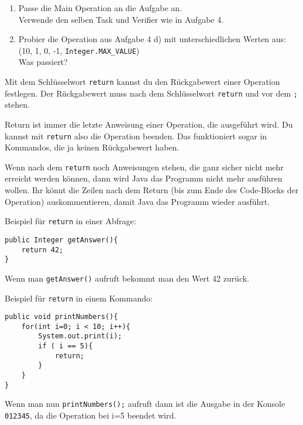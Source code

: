 
\begin{enumerate}
	\item
		Passe die Main Operation an die Aufgabe an.\\
		Verwende den selben Task und Verifier wie in Aufgabe 4.

	\item
		Probier die Operation aus Aufgabe 4 d) mit unterschiedlichen Werten aus: (10, 1, 0, -1, \lstinline{Integer.MAX_VALUE}) \\
		Was passiert?
\end{enumerate}

	
\begin{Infobox}[Return]
	Mit dem Schlüsselwort \lstinline{return} kannst du den Rückgabewert einer Operation festlegen.
	Der Rückgabewert muss nach dem Schlüsselwort \lstinline{return} und vor dem \lstinline{;} stehen.

	Return ist immer die letzte Anweisung einer Operation, die ausgeführt wird.
	Du kannst mit \lstinline{return} also die Operation beenden.
	Das funktioniert sogar in Kommandos, die ja keinen Rückgabewert haben.

	Wenn nach dem \lstinline{return} noch Anweisungen stehen, die ganz sicher nicht mehr erreicht werden können, dann wird Java das Programm nicht mehr ausführen wollen.
	Ihr könnt die Zeilen nach dem Return (bis zum Ende des Code-Blocks der Operation) auskommentieren, damit Java das Programm wieder ausführt.

	Beispiel für \lstinline{return} in einer Abfrage:
	
	\begin{lstlisting}[xleftmargin=0.5cm]
public Integer getAnswer(){
    return 42;
}
	\end{lstlisting}

	Wenn man \lstinline{getAnswer()} aufruft bekommt man den Wert 42 zurück.

	Beispiel für \lstinline{return} in einem Kommando:

	\begin{lstlisting}[xleftmargin=0.5cm]
public void printNumbers(){
    for(int i=0; i < 10; i++){
        System.out.print(i);
        if ( i == 5){
            return;
        }
    }
}
	\end{lstlisting}

	Wenn man nun \lstinline{printNumbers();} aufruft dann ist die Ausgabe in der Konsole \lstinline{012345}, da die Operation bei i=5 beendet wird.
\end{Infobox}


